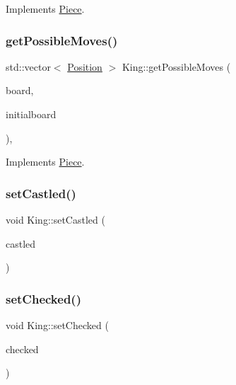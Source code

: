 Implements \hyperlink{class_piece_a4adfa58b4f0368c9a5859afcf294e0a4}{Piece}.

\mbox{\label{class_king_aa8adeaff952af3bf16ebc1c1c0699d43}} 
\subsubsection{\texorpdfstring{get\+Possible\+Moves()}{getPossibleMoves()}}
{\footnotesize\ttfamily std\+::vector$<$ \hyperlink{struct_position}{Position} $>$ King\+::get\+Possible\+Moves (\begin{DoxyParamCaption}\item[{std\+::shared\+\_\+ptr$<$ \hyperlink{class_base_board}{Base\+Board} $>$}]{board,  }\item[{bool}]{initialboard }\end{DoxyParamCaption})\hspace{0.3cm}{\ttfamily [override]}, {\ttfamily [virtual]}}



Implements \hyperlink{class_piece_a8891924c280568529878549f59541925}{Piece}.

\mbox{\label{class_king_a144a81bb4358863415ff41ff851fdbd4}} 
\subsubsection{\texorpdfstring{set\+Castled()}{setCastled()}}
{\footnotesize\ttfamily void King\+::set\+Castled (\begin{DoxyParamCaption}\item[{bool}]{castled }\end{DoxyParamCaption})}

\mbox{\label{class_king_af55ffa8c550debf65d6b64a91472626b}} 
\subsubsection{\texorpdfstring{set\+Checked()}{setChecked()}}
{\footnotesize\ttfamily void King\+::set\+Checked (\begin{DoxyParamCaption}\item[{bool}]{checked }\end{DoxyParamCaption})}



